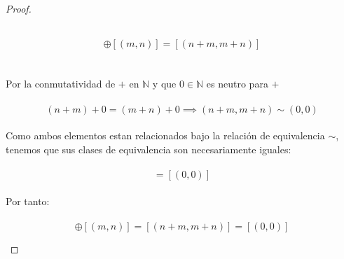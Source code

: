 \documentclass[11pt,letterpaper]{article}
\newcommand{\N}{\mathbb{N}}
\newcommand{\Z}{\mathbb{Z}}
\begin{document}
\begin{proof}
\begin{itemize}
        \,\\
        \begin{equation*}
            [(n,m)]\oplus[(m,n)]=[(n+m,m+n)]
        \end{equation*}\,\\
        \,\\
        Por la conmutatividad de $+$ en $\N$ y que $0\in \N$ es neutro para $+$\,\\
        \,\\
        \begin{equation*}
            (n+m)+0=(m+n)+0\implies (n+m,m+n)\sim(0,0)
        \end{equation*}\,\\
        Como ambos elementos estan relacionados bajo la relaci\'on de equivalencia $\sim$, tenemos que sus clases de equivalencia
        son necesariamente iguales:\,\\
        \,\\
        \begin{equation*}
            [(n+m,m+n)]=[(0,0)]
        \end{equation*}\,\\
        Por tanto:\,\\
        \,\\
        \begin{equation*}
            [(n,m)]\oplus[(m,n)]=[(n+m,m+n)]=[(0,0)]
        \end{equation*}
    \end{itemize}

    
\end{proof}\,\\
\,\\
\end{document}
